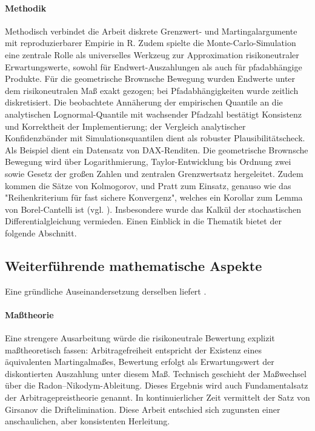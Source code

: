 \paragraph{Methodik}
Methodisch verbindet die Arbeit diskrete Grenzwert- und Martingalargumente mit 
reproduzierbarer Empirie in R. Zudem spielte die Monte-Carlo-Simulation eine zentrale Rolle als universelles Werkzeug zur Approximation risikoneutraler Erwartungswerte, sowohl für Endwert-Auszahlungen als auch für pfadabhängige Produkte. Für die geometrische Brownsche Bewegung wurden Endwerte unter dem risikoneutralen Maß exakt gezogen; bei Pfadabhängigkeiten wurde zeitlich diskretisiert. Die beobachtete Annäherung der empirischen Quantile an die analytischen Lognormal-Quantile mit wachsender Pfadzahl bestätigt Konsistenz und Korrektheit der Implementierung; der Vergleich analytischer Konfidenzbänder mit Simulationsquantilen dient als robuster Plausibilitätscheck.
Als Beispiel dient ein Datensatz von DAX-Renditen.
Die geometrische Brownsche Bewegung wird über Logarithmierung, Taylor-Entwicklung bis Ordnung zwei sowie Gesetz der großen Zahlen und 
zentralen Grenzwertsatz hergeleitet. Zudem kommen die Sätze von Kolmogorov, und Pratt zum Einsatz, 
genauso wie das "Reihenkriterium für fast sichere Konvergenz", welches 
ein Korollar zum Lemma von Borel-Cantelli ist (vgl. \cite{henze}). Insbesondere wurde
das Kalkül der stochastischen Differentialgleichung vermieden. Einen Einblick in die Thematik bietet der
folgende Abschnitt.

\subsection{Weiterführende mathematische Aspekte}
Eine gründliche Auseinandersetzung derselben liefert \cite{shreve}.

\paragraph{Maßtheorie}
Eine strengere Ausarbeitung würde die risikoneutrale Bewertung explizit maßtheoretisch fassen: 
Arbitragefreiheit entspricht der Existenz eines äquivalenten Martingalmaßes, Bewertung erfolgt als 
Erwartungswert der diskontierten Auszahlung unter diesem Maß. Technisch geschieht der 
Maßwechsel über die Radon–Nikodym-Ableitung. Dieses Ergebnis wird auch Fundamentalsatz der Arbitragepreistheorie genannt. 
In kontinuierlicher Zeit vermittelt der Satz von Girsanov die Driftelimination. Diese Arbeit entschied sich zugunsten einer anschaulichen, aber 
konsistenten Herleitung.


